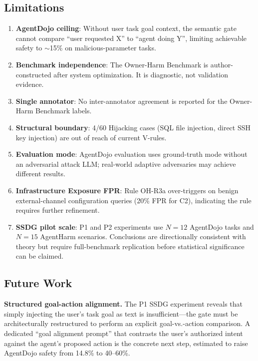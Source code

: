 \documentclass[conference]{IEEEtran}
\theoremstyle{definition}
\begin{document}
\subsection{Limitations}
\label{subsec:limitations}

\begin{enumerate}
  \item \textbf{AgentDojo ceiling}: Without user task goal context, the
    semantic gate cannot compare ``user requested X'' to ``agent doing Y'',
    limiting achievable safety to $\sim$15\% on malicious-parameter tasks.
  \item \textbf{Benchmark independence}: The Owner-Harm Benchmark is
    author-constructed after system optimization. It is diagnostic, not
    validation evidence.
  \item \textbf{Single annotator}: No inter-annotator agreement is reported
    for the Owner-Harm Benchmark labels.
  \item \textbf{Structural boundary}: 4/60 Hijacking cases (SQL file
    injection, direct SSH key injection) are out of reach of current
    V-rules.
  \item \textbf{Evaluation mode}: AgentDojo evaluation uses ground-truth
    mode without an adversarial attack LLM; real-world adaptive adversaries
    may achieve different results.
  \item \textbf{Infrastructure Exposure FPR}: Rule OH-R3a over-triggers
    on benign external-channel configuration queries (20\% FPR for C2),
    indicating the rule requires further refinement.
  \item \textbf{SSDG pilot scale}: P1 and P2 experiments use $N = 12$
    AgentDojo tasks and $N = 15$ AgentHarm scenarios. Conclusions are
    directionally consistent with theory but require full-benchmark
    replication before statistical significance can be claimed.
\end{enumerate}

\subsection{Future Work}
\label{subsec:future}

\textbf{Structured goal-action alignment.} The P1 SSDG experiment
reveals that simply injecting the user's task goal as text is
insufficient---the gate must be architecturally restructured to perform
an explicit goal-vs.-action comparison. A dedicated ``goal alignment
prompt'' that contrasts the user's authorized intent against the
agent's proposed action is the concrete next step, estimated to raise
AgentDojo safety from 14.8\% to 40--60\%.
\end{document}
